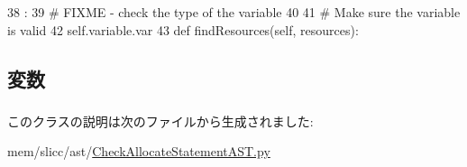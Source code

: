 \begin{DoxyCode}
38                                          :
39         # FIXME - check the type of the variable
40 
41         # Make sure the variable is valid
42         self.variable.var
43 
    def findResources(self, resources):
\end{DoxyCode}


\subsection{変数}
\hypertarget{classslicc_1_1ast_1_1CheckAllocateStatementAST_1_1CheckAllocateStatementAST_a9cd756653e5b34f63d5cf5c342143cb5}{
\subsubsection[{variable}]{}}
\label{classslicc_1_1ast_1_1CheckAllocateStatementAST_1_1CheckAllocateStatementAST_a9cd756653e5b34f63d5cf5c342143cb5}


このクラスの説明は次のファイルから生成されました:\begin{DoxyCompactItemize}
\item 
mem/slicc/ast/\hyperlink{CheckAllocateStatementAST_8py}{CheckAllocateStatementAST.py}\end{DoxyCompactItemize}
